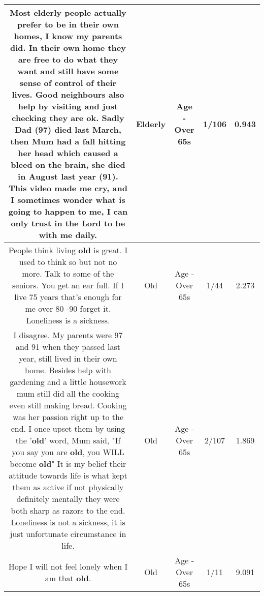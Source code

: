 \documentclass[11pt]{article}
\newlength\mylength
\begin{document}
\begin{center}
\begin{longtable}{|C{.65\mylength}|C{.30\mylength}|C{.12\mylength}|C{.12\mylength}|C{.12\mylength}|}
  \small Most \textbf{elderly} people actually prefer to be in their own homes, I know my parents did.   In their own home they are free to do what they want and still have some sense of control of their lives.  Good neighbours also help by visiting and just checking they are ok.  Sadly Dad (97) died last March, then Mum had a fall hitting her head which caused a bleed on the brain, she died in August last year (91).   This video made me cry, and I sometimes wonder what is going to happen to me, I can only trust in the Lord to be with me daily.\normalsize   & Elderly & Age - Over 65s & 1/106 & 0.943 \\  \hline
  \small People think living \textbf{old} is great. I used to think so but not no more. Talk to some of the seniors. You get an ear full. If I live 75 years that's enough for me over 80 -90 forget it. Loneliness is a sickness.\normalsize   & Old & Age - Over 65s & 1/44 & 2.273 \\  \hline
  \small I disagree.  My parents were 97 and 91 when they passed last year, still lived in their own home.  Besides help with gardening and a little housework mum still did all the cooking even still making bread.   Cooking was her passion right up to the end. I once upset them by using the '\textbf{old}' word, Mum said, "If you say you are \textbf{old}, you WILL become \textbf{old}"  It is my belief their attitude towards life is what kept them as active if not physically definitely mentally they were both sharp as razors to the end. Loneliness is not a sickness, it is just unfortunate circumstance in life.\normalsize   & Old & Age - Over 65s & 2/107 & 1.869 \\  \hline
  \small Hope I will not feel lonely when I am that \textbf{old}.\normalsize   & Old & Age - Over 65s & 1/11 & 9.091 \\  \hline

\end{longtable}
\end{center}
\end{document}
